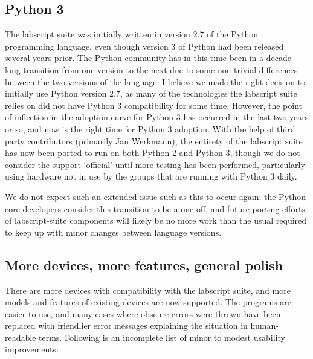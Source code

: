 \subsection{Python 3}

The labscript suite was initially written in version 2.7 of the Python programming language, even though version 3 of Python had been released several years prior. The Python community has in this time been in a decade-long transition from one version to the next due to some non-trivial differences between the two versions of the language. I believe we made the right decision to initially use Python version 2.7, as many of the technologies the labscript suite relies on did not have Python 3 compatibility for some time. However, the point of inflection in the adoption curve for Python 3 has occurred in the last two years or so, and now is the right time for Python 3 adoption. With the help of third party contributors (primarily Jan Werkmann), the entirety of the labscript suite has now been ported to run on both Python 2 and Python 3, though we do not consider the support `official' until more testing has been performed, particularly using hardware not in use by the groups that are running with Python 3 daily.

We do not expect such an extended issue such as this to occur again: the Python core developers consider this transition to be a one-off, and future porting efforts of labscript-suite components will likely be no more work than the usual required to keep up with minor changes between language versions.

\subsection{More devices, more features, general polish}

There are more devices with compatibility with the labscript suite, and more models and features of existing devices are now supported. The programs are easier to use, and many cases where obscure errors were thrown have been replaced with friendlier error messages explaining the situation in human-readable terms. Following is an incomplete list of minor to modest usability improvements:

